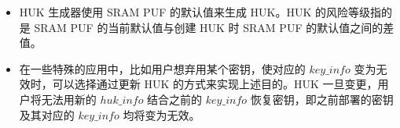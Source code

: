 \documentclass[main\_\_CN.tex]{subfiles}
\begin{document}
\vspace{-0.5em}
\begin{tiplisting}
\vspace{-2em}
\begin{itemize}
    \item HUK 生成器使用 SRAM PUF 的默认值来生成 HUK。HUK 的风险等级指的是 SRAM PUF 的当前默认值与创建 HUK 时 SRAM PUF 的默认值之间的差值。
    \item 在一些特殊的应用中，比如用户想弃用某个密钥，使对应的 \hyperref[para:keyinfo]{\begin{math}key\_info\end{math}} 变为无效时，可以选择通过更新 HUK 的方式来实现上述目的。HUK 一旦变更，用户将无法用新的 \hyperref[para:hukinfo]{\begin{math}huk\_info\end{math}} 结合之前的 \hyperref[para:keyinfo]{\begin{math}key\_info\end{math}} 恢复密钥，即之前部署的密钥及其对应的 \hyperref[para:keyinfo]{\begin{math}key\_info\end{math}} 均将变为无效。
\end{itemize}
\end{tiplisting}
\end{document}
